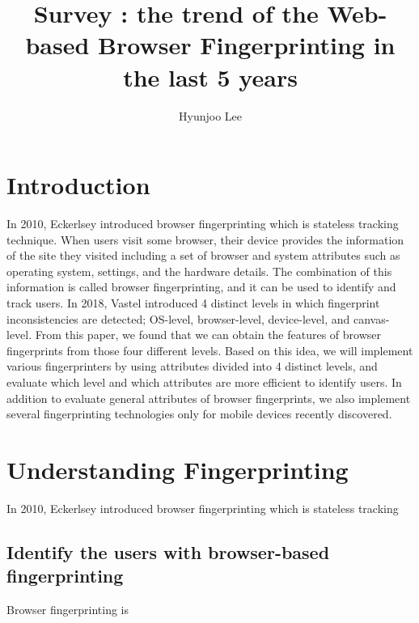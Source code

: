\documentclass[sigconf]{acmart}   	%
\begin{document}
\title{Survey : the trend of the Web-based Browser Fingerprinting in the last 5 years}
\author{Hyunjoo Lee}

\maketitle
\section{Introduction}
 In 2010, Eckerlsey \cite{eckersley2010unique} introduced browser fingerprinting which is stateless tracking technique. When users visit some browser, their device provides the information of the site they visited including a set of browser and system attributes such as operating system, settings, and the hardware details. The combination of this information is called browser fingerprinting, and it can be used to identify and track users. In 2018, Vastel \cite{vastel2018fp} introduced 4 distinct levels in which fingerprint inconsistencies are detected; OS-level, browser-level, device-level, and canvas-level. From this paper, we found that we can obtain the features of browser fingerprints from those four different levels. Based on this idea, we will implement various fingerprinters by using attributes divided into 4 distinct levels, and evaluate which level and which attributes are more efficient to identify users. In addition to evaluate general attributes of browser fingerprints, we also implement several fingerprinting technologies only for mobile devices recently discovered\cite{laperdrix2016beauty}. 
 
 \section{Understanding Fingerprinting}
  In 2010, Eckerlsey \cite{eckersley2010unique} introduced browser fingerprinting which is stateless tracking
 \subsection{Identify the users with browser-based fingerprinting}
Browser fingerprinting is 
\end{document}

